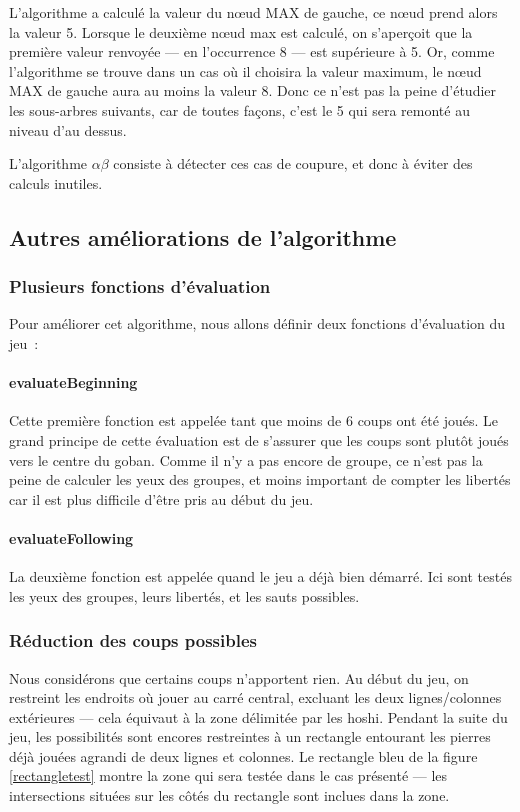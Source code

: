 \documentclass[11pt,a4paper,titlepage,french]{article}
\begin{document}
				L'algorithme a calculé la valeur du nœud MAX de gauche, ce nœud prend alors la valeur 5. Lorsque le deuxième nœud max est calculé, on s'aperçoit que la première valeur renvoyée --- en l'occurrence 8 --- est supérieure à 5. Or, comme l'algorithme se trouve dans un cas où il choisira la valeur maximum, le nœud MAX de gauche aura au moins la valeur 8. Donc ce n'est pas la peine d'étudier les sous-arbres suivants, car de toutes façons, c'est le 5 qui sera remonté au niveau d'au dessus.

				L'algorithme $\alpha\beta$ consiste à détecter ces cas de coupure, et donc à éviter des calculs inutiles.


		\subsection{Autres améliorations de l'algorithme}

			\subsubsection{Plusieurs fonctions d'évaluation}
				Pour améliorer cet algorithme, nous allons définir deux fonctions d'évaluation du jeu~:

				\paragraph{evaluateBeginning}
					Cette première fonction est appelée tant que moins de 6 coups ont été joués. Le grand principe de cette évaluation est de s'assurer que les coups sont plutôt joués vers le centre du goban. Comme il n'y a pas encore de groupe, ce n'est pas la peine de calculer les yeux des groupes, et moins important de compter les libertés car il est plus difficile d'être pris au début du jeu.


				\paragraph{evaluateFollowing}
					La deuxième fonction est appelée quand le jeu a déjà bien démarré. Ici sont testés les yeux des groupes, leurs libertés, et les sauts possibles.

			\subsubsection{Réduction des coups possibles}
				Nous considérons que certains coups n'apportent rien. Au début du jeu, on restreint les endroits où jouer au carré central, excluant les deux lignes/colonnes extérieures --- cela équivaut à la zone délimitée par les hoshi. Pendant la suite du jeu, les possibilités  sont encores restreintes à un rectangle entourant les pierres déjà jouées agrandi de deux lignes et colonnes. Le rectangle bleu de la figure \ref{rectangletest} montre la zone qui sera testée dans le cas présenté --- les intersections situées sur les côtés du rectangle sont inclues dans la zone.
\end{document}
